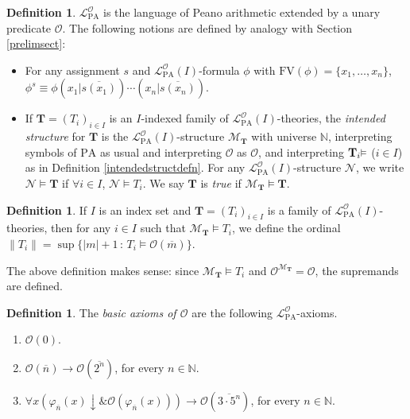 \documentclass[reqno]{article}
\theoremstyle{definition}
\newtheorem{definition}[theorem]{Definition}
\def\N{\mathbb{N}}
\def\L{\mathscr{L}}
\def\M{\mathscr{M}}
\def\T{\mathbf{T}}
\def\O{\mathcal{O}}
\def\FV{\mathrm{FV}}
\def\LPO{\L^{\mathcal{O}}_{\mathrm{PA}}}
\renewcommand{\Pr}[1]{\T_{#1}\mbox{\small${\vDash}$}}
\begin{document}
\begin{definition}
$\LPO$ is the language of Peano arithmetic extended by
a unary predicate $\O$.
%
%
The following notions are defined by analogy with Section \ref{prelimsect}:
\begin{itemize}
\item For any assignment $s$ and $\LPO(I)$-formula $\phi$ with $\FV(\phi){=}\{x_1,\ldots,x_n\}$,
$\phi^s\equiv\phi(x_1|\overline{s(x_1)})\cdots(x_n|\overline{s(x_n)})$.
\item If $\T=(T_i)_{i\in I}$ is an $I$-indexed family of $\LPO(I)$-theories,
the \emph{intended structure} for $\T$ is the $\LPO(I)$-structure
$\M_\T$ with universe $\N$, interpreting symbols of $\mathrm{PA}$ as usual
and interpreting $\O$ as $\mathcal O$, and interpreting $\Pr i$ ($i\in I$)
as in Definition \ref{intendedstructdefn}.
For any $\LPO(I)$-structure $\mathscr N$, we write $\mathscr N\models \T$
if $\forall i\in I$, $\mathscr N\models T_i$.
We say $\T$ is \emph{true} if $\M_\T\models\T$.
%
%
\end{itemize}
\end{definition}

\begin{definition}
If $I$ is an index set and 
$\T=(T_i)_{i\in I}$ is a family of $\LPO(I)$-theories,
then for any $i\in I$
such that $\M_\T\models T_i$,
we define the ordinal $\|T_i\|=\sup\{|m|+1\,:\,T_i\models\O(\overline m)\}$.
\end{definition}

The above definition makes sense:
since $\M_\T\models T_i$
and $\O^{\M_\T}=\O$,
the supremands are defined.



\begin{definition}
\label{basicaxiomsofodefn}
The \emph{basic axioms of $\O$} are the following $\LPO$-axioms.
\begin{enumerate}
\item $\O(0)$.
\item $\O(\overline n)\rightarrow \O(\overline{2^n})$, for every $n\in\N$.
\item $\forall x(\varphi_{\overline n}(x){\downarrow}\mathrel{\&}\O(\varphi_{\overline n}(x)))
\rightarrow
\O(\overline{3\cdot 5^n})$, for every $n\in\N$.
\end{enumerate}
\end{definition}
\end{document}
